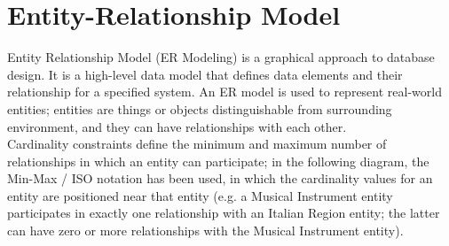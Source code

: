 \documentclass[../../DD.tex]{subfiles}
\begin{document}
\section{Entity-Relationship Model}

	Entity Relationship Model (ER Modeling) is a graphical approach to database design. It is a high-level data model that defines data elements and their relationship for a specified system. An ER model is used to represent real-world entities; entities are things or objects distinguishable from surrounding environment, and they can have relationships with each other.\\
	Cardinality constraints define the minimum and maximum number of relationships in which an entity can participate; in the following diagram, the Min-Max / ISO notation has been used, in which the cardinality values for an entity are positioned near that entity (e.g. a Musical Instrument entity participates in exactly one relationship with an Italian Region entity; the latter can have zero or more relationships with the Musical Instrument entity).
\end{document}
